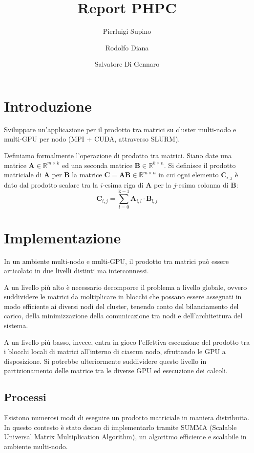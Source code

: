 \documentclass[a4paper]{article}
\title{Report PHPC}
\author{Pierluigi Supino \and Rodolfo Diana \and Salvatore Di Gennaro}
\begin{document}
\maketitle
\tableofcontents

\section{Introduzione}

Sviluppare un’applicazione per il prodotto tra matrici su cluster multi-nodo e multi-GPU per nodo (MPI + CUDA, attraverso SLURM).

Definiamo formalmente l'operazione di prodotto tra matrici.
Siano date una matrice $\mathbf{A} \in \mathbb{R}^{m\times{k}}$ ed una seconda matrice $\mathbf{B} \in \mathbb{R}^{k\times{n}}$.
Si definisce il prodotto matriciale di $\mathbf{A}$ per $\mathbf{B}$ la matrice $\mathbf{C}=\mathbf{A}\mathbf{B} \in \mathbb{R}^{m\times{n}}$ in cui ogni elemento $\mathbf{C}_{i,j}$ è dato dal prodotto scalare tra la $i$-esima riga di $\mathbf{A}$ per la $j$-esima colonna di $\mathbf{B}$:
$$ \mathbf{C}_{i,j} = \sum_{l=0}^{\text{k}-1} \mathbf{A}_{i, l} \cdot \mathbf{B}_{l, j} $$

\section{Implementazione}
In un ambiente multi-nodo e multi-GPU, il prodotto tra matrici può essere articolato in due livelli distinti ma interconnessi.

A un livello più alto è necessario decomporre il problema a livello globale, ovvero suddividere le matrici da moltiplicare in blocchi che possano essere assegnati in modo efficiente ai diversi nodi del cluster, tenendo conto del bilanciamento del carico, della minimizzazione della comunicazione tra nodi e dell'architettura del sistema.

A un livello più basso, invece, entra in gioco l’effettiva esecuzione del prodotto tra i blocchi locali di matrici all’interno di ciascun nodo, sfruttando le GPU a disposizione. Si potrebbe ulteriormente suddividere questo livello in partizionamento delle matrice tra le diverse GPU ed esecuzione dei calcoli.

\subsection{Processi}
Esistono numerosi modi di eseguire un prodotto matriciale in maniera distribuita. In questo contesto è stato deciso di implementarlo tramite SUMMA (Scalable Universal Matrix Multiplication Algorithm), un algoritmo efficiente e scalabile in ambiente multi-nodo\cite{SUMMA}.
\end{document}

